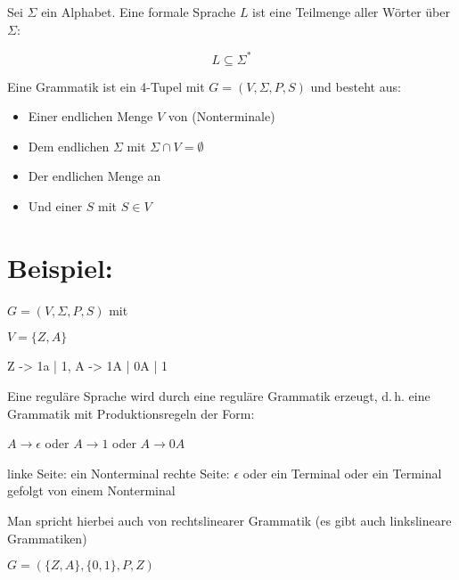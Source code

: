 \documentclass{lehramt-informatik-haupt}
\begin{document}
Sei $\Sigma$ ein Alphabet. Eine formale Sprache $L$ ist eine Teilmenge
aller Wörter über $\Sigma$:

\begin{displaymath}
L \subseteq \Sigma^*
\end{displaymath}

\bigskip

\noindent
Eine Grammatik ist ein 4-Tupel mit $G = (V, \Sigma, P, S)$ und besteht aus:

\begin{itemize}
\item Einer endlichen Menge $V$ von  (Nonterminale)

\item Dem endlichen  $\Sigma$ mit $\Sigma \cap V
= \emptyset$

\item Der endlichen Menge an 

\item Und einer  $S$ mit $S \in V$
\end{itemize}

%

\section{Beispiel:}

$G = (V, \Sigma, P, S)$ mit

$V = \{Z, A\}$


\begin{liProduktionsRegeln}
Z -> 1a | 1,
A -> 1A | 0A | 1
\end{liProduktionsRegeln}

Eine reguläre Sprache wird durch eine reguläre Grammatik erzeugt, d.\,h.
eine Grammatik mit Produktionsregeln der Form:

$A \rightarrow \epsilon$ oder $A \rightarrow 1$ oder $A \rightarrow 0A$

linke Seite: ein Nonterminal rechte Seite: $\epsilon$ oder ein Terminal
oder ein Terminal gefolgt von einem Nonterminal

Man spricht hierbei auch von rechtslinearer Grammatik (es gibt auch
linkslineare Grammatiken)

$G = (\{Z, A\}, \{0, 1\}, P, Z)$
\end{document}
